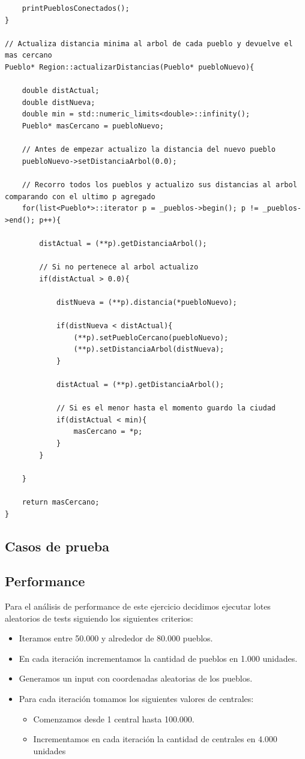 \begin{lstlisting}
	printPueblosConectados();	
}

// Actualiza distancia minima al arbol de cada pueblo y devuelve el mas cercano
Pueblo* Region::actualizarDistancias(Pueblo* puebloNuevo){

	double distActual;
	double distNueva;
	double min = std::numeric_limits<double>::infinity();
	Pueblo* masCercano = puebloNuevo;

	// Antes de empezar actualizo la distancia del nuevo pueblo
	puebloNuevo->setDistanciaArbol(0.0);

	// Recorro todos los pueblos y actualizo sus distancias al arbol comparando con el ultimo p agregado
	for(list<Pueblo*>::iterator p = _pueblos->begin(); p != _pueblos->end(); p++){

		distActual = (**p).getDistanciaArbol();

		// Si no pertenece al arbol actualizo
		if(distActual > 0.0){

			distNueva = (**p).distancia(*puebloNuevo);
			
			if(distNueva < distActual){
				(**p).setPuebloCercano(puebloNuevo);
				(**p).setDistanciaArbol(distNueva);
			}

			distActual = (**p).getDistanciaArbol();

			// Si es el menor hasta el momento guardo la ciudad
			if(distActual < min){
				masCercano = *p;
			}
		}
	
	}

	return masCercano;
}

\end{lstlisting}

\subsection{Casos de prueba}

\subsection{Performance}

Para el an\'alisis de performance de este ejercicio decidimos ejecutar lotes aleatorios de tests siguiendo los siguientes criterios:

\begin{itemize}
	\item Iteramos entre 50.000 y alrededor de 80.000 pueblos.
	\item En cada iteraci\'on incrementamos la cantidad de pueblos en 1.000 unidades.
	\item Generamos un input con coordenadas aleatorias de los pueblos.
	\item Para cada iteraci\'on tomamos los siguientes valores de centrales:
	\begin{itemize}
		\item Comenzamos desde 1 central hasta 100.000.
		\item Incrementamos en cada iteraci\'on la cantidad de centrales en 4.000 unidades
	\end{itemize}
\end{itemize}

